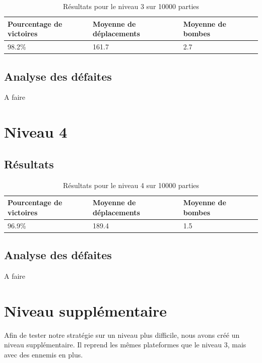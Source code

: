 \begin{table}[!htpb]
    \begin{tabularx}{\textwidth}{lXXX}
        \toprule
        Pourcentage de victoires & Moyenne de déplacements & Moyenne de bombes \\
        \midrule
        98.2\% & 161.7 & 2.7 \\
        \bottomrule
    \end{tabularx}
    \caption{Résultats pour le niveau 3 sur 10000 parties}
    \label{tab:res-niveau-3}
\end{table}

\subsection{Analyse des défaites}

A faire

\newpage

\section{Niveau 4}

\subsection{Résultats}

\begin{table}[!htpb]
    \begin{tabularx}{\textwidth}{lXXX}
        \toprule
        Pourcentage de victoires & Moyenne de déplacements & Moyenne de bombes \\
        \midrule
        96.9\% & 189.4 & 1.5 \\
        \bottomrule
    \end{tabularx}
    \caption{Résultats pour le niveau 4 sur 10000 parties}
    \label{tab:res-niveau-4}
\end{table}

\subsection{Analyse des défaites}

A faire

\section{Niveau supplémentaire}

Afin de tester notre stratégie sur un niveau plus difficile, nous avons créé un niveau supplémentaire.
Il reprend les mêmes plateformes que le niveau 3, mais avec des ennemis en plus.

